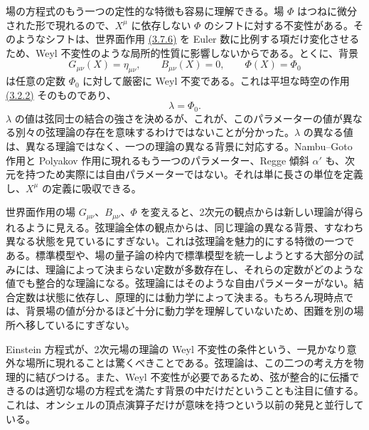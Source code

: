 
場の方程式のもう一つの定性的な特徴も容易に理解できる。場 $\Phi$ はつねに微分された形で現れるので、$X^\mu$ に依存しない $\Phi$ のシフトに対する不変性がある。そのようなシフトは、世界面作用 \hyperref[eq:3.7.6]{(3.7.6)} を Euler 数に比例する項だけ変化させるため、Weyl 不変性のような局所的性質に影響しないからである。とくに、背景
\begin{equation}
G_{\mu\nu}(X)=\eta_{\mu\nu},\qquad
B_{\mu\nu}(X)=0,\qquad \Phi(X)=\Phi_0
\tag{3.7.16}\label{eq:3.7.16}
\end{equation}
は任意の定数 $\Phi_0$ に対して厳密に Weyl 不変である。これは平坦な時空の作用 \hyperref[eq:3.2.2]{(3.2.2)} そのものであり、
\begin{equation}
\lambda=\Phi_0.
\tag{3.7.17}\label{eq:3.7.17}
\end{equation}
$\lambda$ の値は弦同士の結合の強さを決めるが、これが、このパラメーターの値が異なる別々の弦理論の存在を意味するわけではないことが分かった。$\lambda$ の異なる値は、異なる理論ではなく、一つの理論の異なる背景に対応する。Nambu--Goto 作用と Polyakov 作用に現れるもう一つのパラメーター、Regge 傾斜 $\alpha'$ も、次元を持つため実際には自由パラメーターではない。それは単に長さの単位を定義し、$X^\mu$ の定義に吸収できる。

世界面作用の場 $G_{\mu\nu}$、$B_{\mu\nu}$、$\Phi$ を変えると、2次元の観点からは新しい理論が得られるように見える。弦理論全体の観点からは、同じ理論の異なる背景、すなわち異なる状態を見ているにすぎない。これは弦理論を魅力的にする特徴の一つである。標準模型や、場の量子論の枠内で標準模型を統一しようとする大部分の試みには、理論によって決まらない定数が多数存在し、それらの定数がどのような値でも整合的な理論になる。弦理論にはそのような自由パラメーターがない。結合定数は状態に依存し、原理的には動力学によって決まる。もちろん現時点では、背景場の値が分かるほど十分に動力学を理解していないため、困難を別の場所へ移しているにすぎない。

Einstein 方程式が、2次元場の理論の Weyl 不変性の条件という、一見かなり意外な場所に現れることは驚くべきことである。弦理論は、この二つの考え方を物理的に結びつける。また、Weyl 不変性が必要であるため、弦が整合的に伝播できるのは適切な場の方程式を満たす背景の中だけだということも注目に値する。これは、オンシェルの頂点演算子だけが意味を持つという以前の発見と並行している。

